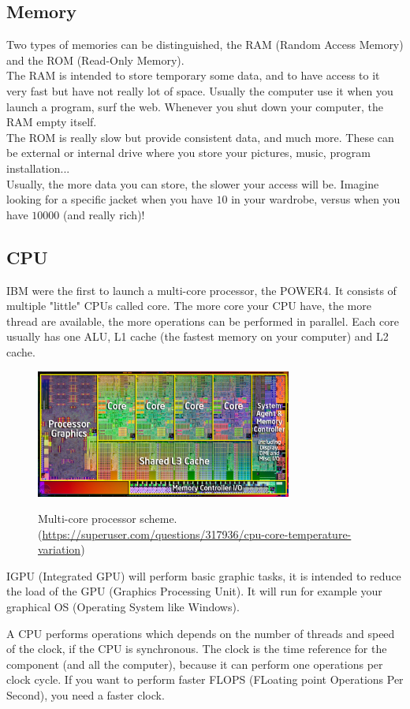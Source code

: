 \documentclass[runningheads,a4paper]{llncs}
\begin{document}
	\subsection{Memory}
	Two types of memories can be distinguished, the RAM (Random Access Memory) and the ROM (Read-Only Memory).\\ The RAM is intended to store temporary some data, and to have access to it very fast but have not really lot of space. Usually the computer use it when you launch a program, surf the web. Whenever you shut down your computer, the RAM empty itself.
	\\
	The ROM is really slow but provide consistent data, and much more. These can be external or internal drive where you store your pictures, music, program installation...\\
	Usually, the more data you can store, the slower your access will be. Imagine looking for a specific jacket when you have $10$ in your wardrobe, versus when you have $10000$ (and really rich)!
	\subsection{CPU}
	IBM were the first to launch a multi-core processor, the POWER4\cite{tendler2002power4}.
	It consists of multiple "little" CPUs called core. The more core your CPU have, the more thread are available, the more operations can be performed in parallel. Each core usually has one ALU, L1 cache (the fastest memory on your computer) and L2 cache.
	
	\begin{figure}
		\centering
		\includegraphics[width=0.75\textwidth]{Figures/multicore}
		\\ \parbox{0.75\textwidth}{\caption[multicore]{Multi-core processor scheme. (\url{https://superuser.com/questions/317936/cpu-core-temperature-variation}) }\label{fig:multicore}} 
	\end{figure}
	
	IGPU (Integrated GPU) will perform basic graphic tasks, it is intended to reduce the load of the GPU (Graphics Processing Unit). It will run for example your graphical OS (Operating System like Windows).\par
	A CPU performs operations which depends on the number of  threads and speed of the clock, if the CPU is synchronous. The clock is the time reference for the component (and all the computer), because it can perform one operations per clock cycle. If you want to perform faster FLOPS (FLoating point Operations Per Second), you need a faster clock.
\end{document}
